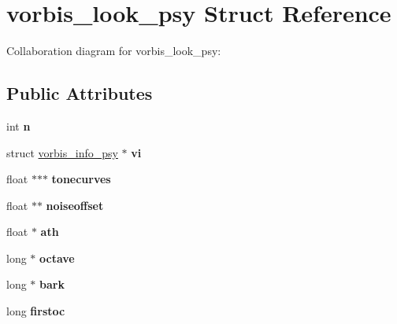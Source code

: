 \hypertarget{structvorbis__look__psy}{\section{vorbis\+\_\+look\+\_\+psy Struct Reference}
\label{structvorbis__look__psy}
}


Collaboration diagram for vorbis\+\_\+look\+\_\+psy\+:
\subsection*{Public Attributes}
\begin{DoxyCompactItemize}
\item 
\hypertarget{structvorbis__look__psy_a32e7f5f9a3c335d9376c9b3ffb3dd929}{int {\bfseries n}}\label{structvorbis__look__psy_a32e7f5f9a3c335d9376c9b3ffb3dd929}

\item 
\hypertarget{structvorbis__look__psy_a7e8428a907f20c860e64ec33d45309d8}{struct \hyperlink{structvorbis__info__psy}{vorbis\+\_\+info\+\_\+psy} $\ast$ {\bfseries vi}}\label{structvorbis__look__psy_a7e8428a907f20c860e64ec33d45309d8}

\item 
\hypertarget{structvorbis__look__psy_af99844cac8795514329522d9855d0494}{float $\ast$$\ast$$\ast$ {\bfseries tonecurves}}\label{structvorbis__look__psy_af99844cac8795514329522d9855d0494}

\item 
\hypertarget{structvorbis__look__psy_a856b96ea21a9902f3564f0baa81de0d4}{float $\ast$$\ast$ {\bfseries noiseoffset}}\label{structvorbis__look__psy_a856b96ea21a9902f3564f0baa81de0d4}

\item 
\hypertarget{structvorbis__look__psy_a3446b16512508584e3d81cfbb07ab390}{float $\ast$ {\bfseries ath}}\label{structvorbis__look__psy_a3446b16512508584e3d81cfbb07ab390}

\item 
\hypertarget{structvorbis__look__psy_a3bd4830be6d4d265ab06dbbc26926648}{long $\ast$ {\bfseries octave}}\label{structvorbis__look__psy_a3bd4830be6d4d265ab06dbbc26926648}

\item 
\hypertarget{structvorbis__look__psy_ab26f48178c7d4493eb8a814553441844}{long $\ast$ {\bfseries bark}}\label{structvorbis__look__psy_ab26f48178c7d4493eb8a814553441844}

\item 
\hypertarget{structvorbis__look__psy_aa989a7d275eaa49f05d406a9760c9fcc}{long {\bfseries firstoc}}\label{structvorbis__look__psy_aa989a7d275eaa49f05d406a9760c9fcc}


\end{DoxyCompactItemize}
